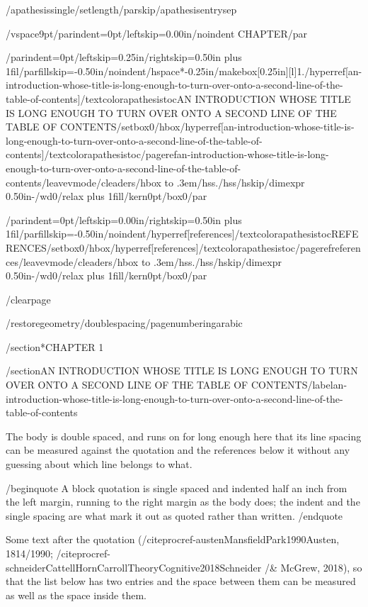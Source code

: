 {/apathesissingle/setlength{/parskip}{/apathesisentrysep}

/vspace{9pt}{/parindent=0pt/leftskip=0.00in/noindent CHAPTER/par}

{/parindent=0pt/leftskip=0.25in/rightskip=0.50in plus 1fil/parfillskip=-0.50in/noindent/hspace*{-0.25in}/makebox[0.25in][l]{1.}/hyperref[an-introduction-whose-title-is-long-enough-to-turn-over-onto-a-second-line-of-the-table-of-contents]{/textcolor{apathesistoc}{AN INTRODUCTION WHOSE TITLE IS LONG ENOUGH TO TURN OVER ONTO A SECOND
LINE OF THE TABLE OF CONTENTS}}/setbox0/hbox{/hyperref[an-introduction-whose-title-is-long-enough-to-turn-over-onto-a-second-line-of-the-table-of-contents]{/textcolor{apathesistoc}{/pageref{an-introduction-whose-title-is-long-enough-to-turn-over-onto-a-second-line-of-the-table-of-contents}}}}/leavevmode/cleaders/hbox to .3em{/hss./hss}/hskip/dimexpr 0.50in-/wd0/relax plus 1fill/kern0pt/box0/par}

{/parindent=0pt/leftskip=0.00in/rightskip=0.50in plus 1fil/parfillskip=-0.50in/noindent/hyperref[references]{/textcolor{apathesistoc}{REFERENCES}}/setbox0/hbox{/hyperref[references]{/textcolor{apathesistoc}{/pageref{references}}}}/leavevmode/cleaders/hbox to .3em{/hss./hss}/hskip/dimexpr 0.50in-/wd0/relax plus 1fill/kern0pt/box0/par}

}

/clearpage

/restoregeometry/doublespacing/pagenumbering{arabic}

/section*{CHAPTER 1}

/section{AN INTRODUCTION WHOSE TITLE IS LONG ENOUGH TO TURN OVER ONTO A
SECOND LINE OF THE TABLE OF
CONTENTS}/label{an-introduction-whose-title-is-long-enough-to-turn-over-onto-a-second-line-of-the-table-of-contents}

The body is double spaced, and runs on for long enough here that its
line spacing can be measured against the quotation and the references
below it without any guessing about which line belongs to what.

/begin{quote}
A block quotation is single spaced and indented half an inch from the
left margin, running to the right margin as the body does; the indent
and the single spacing are what mark it out as quoted rather than
written.
/end{quote}

Some text after the quotation
(/citeproc{ref-austenMansfieldPark1990}{Austen, 1814/1990};
/citeproc{ref-schneiderCattellHornCarrollTheoryCognitive2018}{Schneider
/& McGrew, 2018}), so that the list below has two entries and the space
between them can be measured as well as the space inside them.

